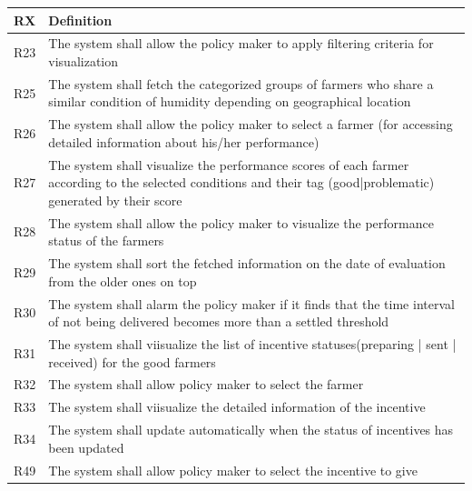 \begin{center}
    \setlength\arrayrulewidth{1pt}
    \begin{longtable}{|c|m{}|}
            
            \hline
            \rowcolor{myblue}\color{white}RX & \color{white}Definition \\
            \hline
            \textsc{R23}     &   The system shall allow the policy maker to apply filtering criteria for visualization   \\
            \hline
            \textsc{R25}  &    The system shall fetch the categorized groups of farmers who share a similar condition of humidity depending on geographical location\\
            \hline
            \textsc{R26}  &    The system shall allow the policy maker to select a farmer (for accessing detailed information about his/her performance) \\
            \hline
            \textsc{R27}  &    The system shall visualize the performance scores of each farmer according to the selected conditions and their tag (good|problematic) generated by their score\\
            \hline
            \textsc{R28}  &    The system shall allow the policy maker to visualize the performance status of the farmers\\
            \hline
            \textsc{R29}  &    The system shall sort the fetched information on the date of evaluation from the older ones on top\\
            \hline
            \textsc{R30}  &    The system shall alarm the policy maker if it finds that the time interval of not being delivered becomes more than a settled threshold \\
            \hline
            \textsc{R31}  &    The system shall viisualize the list of incentive statuses(preparing | sent | received) for the good farmers \\
            \hline
            \textsc{R32}  &    The system shall allow policy maker to select the farmer \\
            \hline
            \textsc{R33}  &    The system shall viisualize the detailed information of the incentive \\
            \hline
            \textsc{R34}  &    The system shall update automatically when the status of incentives has been updated \\
            \hline
            \textsc{R49}  &    The system shall allow policy maker to select the incentive to give \\

\end{longtable}
\end{center}

